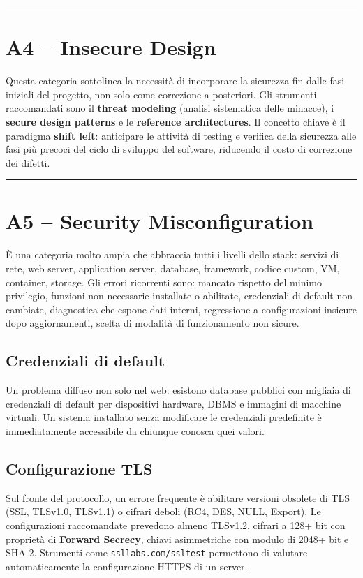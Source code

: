 \documentclass[12pt, a4paper]{report}
\begin{document}
\noindent\rule{\textwidth}{0.4pt}

\section{A4 – Insecure Design}

Questa categoria sottolinea la necessità di incorporare la sicurezza fin dalle fasi iniziali del progetto, non solo come correzione a posteriori. Gli strumenti raccomandati sono il \textbf{threat modeling} (analisi sistematica delle minacce), i \textbf{secure design patterns} e le \textbf{reference architectures}. Il concetto chiave è il paradigma \textbf{shift left}: anticipare le attività di testing e verifica della sicurezza alle fasi più precoci del ciclo di sviluppo del software, riducendo il costo di correzione dei difetti.

\noindent\rule{\textwidth}{0.4pt}

\section{A5 – Security Misconfiguration}

È una categoria molto ampia che abbraccia tutti i livelli dello stack: servizi di rete, web server, application server, database, framework, codice custom, VM, container, storage. Gli errori ricorrenti sono: mancato rispetto del minimo privilegio, funzioni non necessarie installate o abilitate, credenziali di default non cambiate, diagnostica che espone dati interni, regressione a configurazioni insicure dopo aggiornamenti, scelta di modalità di funzionamento non sicure.

\subsection{Credenziali di default}
Un problema diffuso non solo nel web: esistono database pubblici con migliaia di credenziali di default per dispositivi hardware, DBMS e immagini di macchine virtuali. Un sistema installato senza modificare le credenziali predefinite è immediatamente accessibile da chiunque conosca quei valori.

\subsection{Configurazione TLS}
Sul fronte del protocollo, un errore frequente è abilitare versioni obsolete di TLS (SSL, TLSv1.0, TLSv1.1) o cifrari deboli (RC4, DES, NULL, Export). Le configurazioni raccomandate prevedono almeno TLSv1.2, cifrari a 128+ bit con proprietà di \textbf{Forward Secrecy}, chiavi asimmetriche con modulo di 2048+ bit e SHA-2. Strumenti come \texttt{ssllabs.com/ssltest} permettono di valutare automaticamente la configurazione HTTPS di un server.
\end{document}
